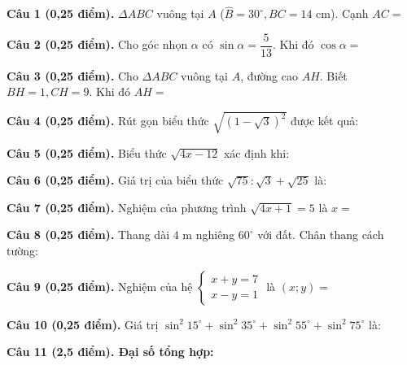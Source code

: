 \documentclass[12pt,a4paper]{article}
\begin{document}
\vspace{1.2mm}
\noindent\textbf{Câu 1 (0,25 điểm).} $\Delta ABC$ vuông tại $A$ ($\widehat{B}=30^\circ, BC=14\text{ cm}$). Cạnh $AC =$ \par\vspace{0.6mm}
\noindent\textbf{Câu 2 (0,25 điểm).} Cho góc nhọn $\alpha$ có $\sin \alpha = \dfrac{5}{13}$. Khi đó $\cos \alpha =$ \par\vspace{0.6mm}
\noindent\textbf{Câu 3 (0,25 điểm).} Cho $\Delta ABC$ vuông tại $A$, đường cao $AH$. Biết $BH=1, CH=9$. Khi đó $AH =$ \par\vspace{0.6mm}
\noindent\textbf{Câu 4 (0,25 điểm).} Rút gọn biểu thức $\sqrt{(1 - \sqrt{3})^2}$ được kết quả: \par\vspace{0.6mm}
\noindent\textbf{Câu 5 (0,25 điểm).} Biểu thức $\sqrt{4x - 12}$ xác định khi: \par\vspace{0.6mm}
\noindent\textbf{Câu 6 (0,25 điểm).} Giá trị của biểu thức $\sqrt{75} : \sqrt{3} + \sqrt{25}$ là: \par\vspace{0.6mm}
\noindent\textbf{Câu 7 (0,25 điểm).} Nghiệm của phương trình $\sqrt{4x + 1} = 5$ là $x =$ \par\vspace{0.6mm}
\noindent\textbf{Câu 8 (0,25 điểm).} Thang dài $4\text{ m}$ nghiêng $60^\circ$ với đất. Chân thang cách tường: \par\vspace{0.6mm}
\noindent\textbf{Câu 9 (0,25 điểm).} Nghiệm của hệ $\begin{cases} x + y = 7 \\ x - y = 1 \end{cases}$ là $(x; y) =$ \par\vspace{0.6mm}
\noindent\textbf{Câu 10 (0,25 điểm).} Giá trị $\sin^2 15^\circ + \sin^2 35^\circ + \sin^2 55^\circ + \sin^2 75^\circ$ là: \par\vspace{0.6mm}
\vspace{0.8mm}
\noindent\textbf{Câu 11 (2,5 điểm). Đại số tổng hợp:}
\vspace{0.6mm}
\end{document}
